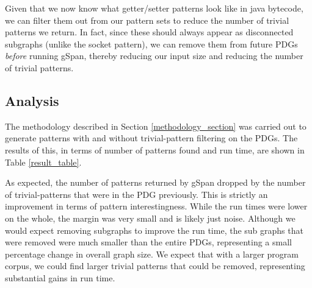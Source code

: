 \documentclass[12pt]{article}
\begin{document}
Given that we now know what getter/setter patterns look like in java bytecode, we can filter them out from our pattern sets to reduce the number of trivial patterns we return. In fact, since these should always appear as disconnected subgraphs (unlike the socket pattern), we can remove them from future PDGs {\em before} running gSpan, thereby reducing our input size and reducing the number of trivial patterns.

\subsection{Analysis}
The methodology described in Section \ref{methodology_section} was carried out to generate patterns with and without trivial-pattern filtering on the PDGs. The results of this, in terms of number of patterns found and run time, are shown in Table \ref{result_table}.

As expected, the number of patterns returned by gSpan dropped by the number of trivial-patterns that were in the PDG previously. This is strictly an improvement in terms of pattern interestingness. While the run times were lower on the whole, the margin was very small and is likely just noise. Although we would expect removing subgraphs to improve the run time, the sub graphs that were removed were much smaller than the entire PDGs, representing a small percentage change in overall graph size. We expect that with a larger program corpus, we could find larger trivial patterns that could be removed, representing substantial gains in run time.
\end{document}
